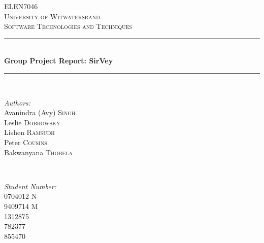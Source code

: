 \documentclass[12pt]{witseiepaper}
\begin{document}
\begin{titlepage}
  
  \newcommand{\HRule}{\rule{\linewidth}{0.5mm}} 
  
  \begin{center}
    
    \textsc{\LARGE ELEN7046}\\[1.5cm]
    
    \textsc{\Large University of Witwatersrand}\\[0.5cm]
    
    \textsc{\large Software Technologies and Techniques}\\[0.5cm]
    
    \HRule \\[0.4cm]
    { \huge \bfseries Group Project Report: SirVey}\\[0.5cm]
    
    \HRule \\[1.5cm]
    \begin{minipage}
      {0.4
      \textwidth} 
      \begin{flushleft}
        \large \emph{Authors:}\\
        Avanindra (Avy) \textsc{Singh} \\
        Leslie \textsc{Dobrowsky} \\
        Lishen \textsc{Ramsudh} \\
        Peter \textsc{Cousins} \\
        Bakwanyana \textsc{Thobela} \\
        
      \end{flushleft}
    \end{minipage}
    ~ 
    \begin{minipage}
      {0.4
      \textwidth} 
      \begin{flushright}
        \large \emph{Student Number:} \\
        0704012 \textsc{N} \\
        9409714 \textsc{M}  \\
        1312875 \\
        782377  \\
        855470
      \end{flushright}
    \end{minipage}
    \\[2cm]
    

\end{center}
\end{titlepage}
\end{document}
